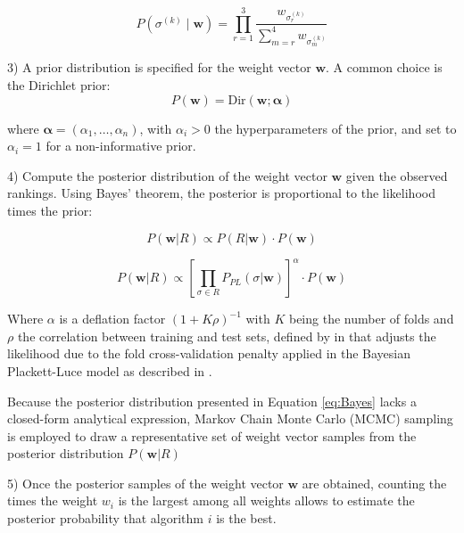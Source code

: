 \begin{equation}
\label{eq:PL}
P(\sigma^{(k)} \mid \mathbf{w}) = \prod_{r=1}^{3} \frac{w_{\sigma_r^{(k)}}}{\sum_{m=r}^{4} w_{\sigma_m^{(k)}}}
\end{equation}


3) A prior distribution is specified for the weight vector $\mathbf{w}$. A common choice is the Dirichlet prior: $$P(\mathbf{w}) = \text{Dir}(\mathbf{w}; \boldsymbol{\alpha})$$ 

where $\boldsymbol{\alpha} = (\alpha_1, \dots, \alpha_n)$, with $\alpha_i > 0$ the hyperparameters of the prior, and set to $\alpha_i = 1$ for a non-informative prior.

4) Compute the posterior distribution of the weight vector $\mathbf{w}$ given the observed rankings. Using Bayes' theorem, the posterior is proportional to the likelihood times the prior:

$$P(\mathbf{w} | R) \propto  P( R|\mathbf{w}) \cdot P(\mathbf{w})$$

\begin{equation}
\label{eq:Bayes}
P(\mathbf{w} | R)  \propto [\prod_{\sigma \in R} P_{PL}(\sigma | \mathbf{w})]^\alpha \cdot P(\mathbf{w})
\end{equation}

Where $\alpha$ is a deflation factor  $(1+K\rho)^{-1}$ with $K$ being the number of folds and $\rho$ the correlation between training and test sets, defined by \citeauthor{nadeau2003inference} in \cite{nadeau2003inference} that adjusts the likelihood due to the fold cross-validation penalty applied in the Bayesian Plackett-Luce model as described in \cite{holmes2017assigning}.

Because the posterior distribution presented in Equation \eqref{eq:Bayes} lacks a closed-form analytical expression, Markov Chain Monte Carlo (MCMC) sampling is employed to draw a representative set of weight vector samples from the posterior distribution $P(\mathbf{w} | R)$

5) Once the posterior samples of the weight vector $\mathbf{w}$ are obtained, counting the times the weight $w_i$ is the largest among all weights allows to estimate the posterior probability that algorithm $i$ is the best.



























